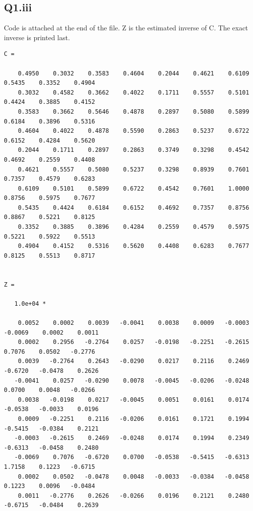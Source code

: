 \documentclass[11pt]{article} %
\begin{document}
\subsection{Q1.iii}
Code is attached at the end of the file. Z is the estimated inverse of C. The exact inverse is printed last.
\footnotesize
\begin{verbatim}
C =

    0.4950    0.3032    0.3583    0.4604    0.2044    0.4621    0.6109    0.5435    0.3352    0.4904
    0.3032    0.4582    0.3662    0.4022    0.1711    0.5557    0.5101    0.4424    0.3885    0.4152
    0.3583    0.3662    0.5646    0.4878    0.2897    0.5080    0.5899    0.6184    0.3896    0.5316
    0.4604    0.4022    0.4878    0.5590    0.2863    0.5237    0.6722    0.6152    0.4284    0.5620
    0.2044    0.1711    0.2897    0.2863    0.3749    0.3298    0.4542    0.4692    0.2559    0.4408
    0.4621    0.5557    0.5080    0.5237    0.3298    0.8939    0.7601    0.7357    0.4579    0.6283
    0.6109    0.5101    0.5899    0.6722    0.4542    0.7601    1.0000    0.8756    0.5975    0.7677
    0.5435    0.4424    0.6184    0.6152    0.4692    0.7357    0.8756    0.8867    0.5221    0.8125
    0.3352    0.3885    0.3896    0.4284    0.2559    0.4579    0.5975    0.5221    0.5922    0.5513
    0.4904    0.4152    0.5316    0.5620    0.4408    0.6283    0.7677    0.8125    0.5513    0.8717


Z =

   1.0e+04 *

    0.0052    0.0002    0.0039   -0.0041    0.0038    0.0009   -0.0003   -0.0069    0.0002    0.0011
    0.0002    0.2956   -0.2764    0.0257   -0.0198   -0.2251   -0.2615    0.7076    0.0502   -0.2776
    0.0039   -0.2764    0.2643   -0.0290    0.0217    0.2116    0.2469   -0.6720   -0.0478    0.2626
   -0.0041    0.0257   -0.0290    0.0078   -0.0045   -0.0206   -0.0248    0.0700    0.0048   -0.0266
    0.0038   -0.0198    0.0217   -0.0045    0.0051    0.0161    0.0174   -0.0538   -0.0033    0.0196
    0.0009   -0.2251    0.2116   -0.0206    0.0161    0.1721    0.1994   -0.5415   -0.0384    0.2121
   -0.0003   -0.2615    0.2469   -0.0248    0.0174    0.1994    0.2349   -0.6313   -0.0458    0.2480
   -0.0069    0.7076   -0.6720    0.0700   -0.0538   -0.5415   -0.6313    1.7158    0.1223   -0.6715
    0.0002    0.0502   -0.0478    0.0048   -0.0033   -0.0384   -0.0458    0.1223    0.0096   -0.0484
    0.0011   -0.2776    0.2626   -0.0266    0.0196    0.2121    0.2480   -0.6715   -0.0484    0.2639



\end{verbatim}
\end{document}
